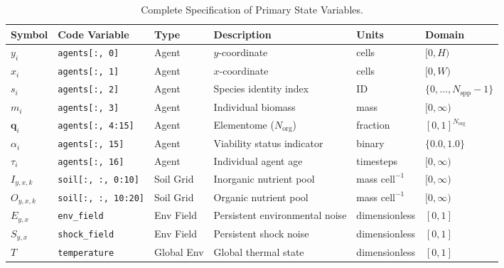 \documentclass[11pt,a4paper]{article}
\begin{document}
\begin{longtable}{lllp{4cm}lp{2.5cm}}
\caption{Complete Specification of Primary State Variables.} \label{tab:state_variables} \\
\toprule
\textbf{Symbol} & \textbf{Code Variable} & \textbf{Type} & \textbf{Description} & \textbf{Units} & \textbf{Domain} \\
\midrule
\endhead
$y_i$ & \texttt{agents[:, 0]} & Agent & $y$-coordinate & cells & $[0, H)$ \\
$x_i$ & \texttt{agents[:, 1]} & Agent & $x$-coordinate & cells & $[0, W)$ \\
$s_i$ & \texttt{agents[:, 2]} & Agent & Species identity index & ID & $\{0, \dots, N_{\text{spp}}-1\}$ \\
$m_i$ & \texttt{agents[:, 3]} & Agent & Individual biomass & mass & $[0, \infty)$ \\
$\boldsymbol{q}_i$ & \texttt{agents[:, 4:15]} & Agent & Elementome ($N_{\text{org}}$) & fraction & $[0, 1]^{N_{\text{org}}}$ \\
$\alpha_i$ & \texttt{agents[:, 15]} & Agent & Viability status indicator & binary & $\{0.0, 1.0\}$ \\
$\tau_i$ & \texttt{agents[:, 16]} & Agent & Individual agent age & timesteps & $[0, \infty)$ \\
$I_{y,x,k}$ & \texttt{soil[:, :, 0:10]} & Soil Grid & Inorganic nutrient pool & mass $\text{cell}^{-1}$ & $[0, \infty)$ \\
$O_{y,x,k}$ & \texttt{soil[:, :, 10:20]} & Soil Grid & Organic nutrient pool & mass $\text{cell}^{-1}$ & $[0, \infty)$ \\
$E_{y,x}$ & \texttt{env\_field} & Env Field & Persistent environmental noise & dimensionless & $[0, 1]$ \\
$S_{y,x}$ & \texttt{shock\_field} & Env Field & Persistent shock noise & dimensionless & $[0, 1]$ \\
$T$ & \texttt{temperature} & Global Env & Global thermal state & dimensionless & $[0, 1]$ \\
\bottomrule
\end{longtable}
\end{document}
